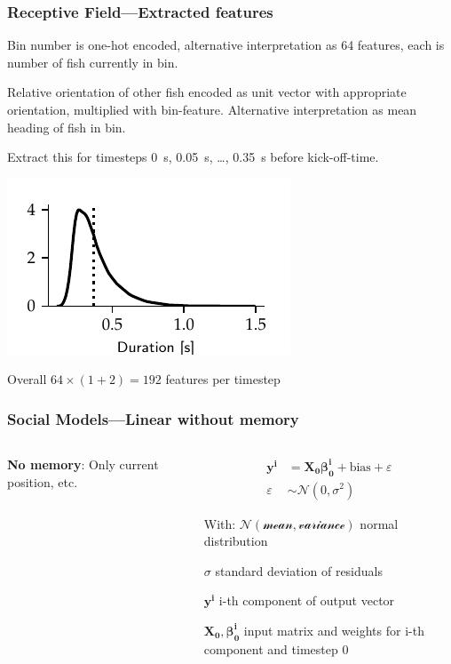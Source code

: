 \documentclass{beamer}
\begin{document}
\begin{frame}
  \frametitle{Receptive Field---Extracted features}
  Bin number is one-hot encoded, alternative interpretation as 64 features, each is number of fish currently in bin.

  Relative orientation of other fish encoded as unit vector with appropriate orientation, multiplied with bin-feature.
  Alternative interpretation as mean heading of fish in bin.

  Extract this for timesteps \SI{0}{\s}, \SI{0.05}{s}, \ldots, \SI{0.35}{\s} before kick-off-time.

  \includegraphics{kick_duration_beamer}

  Overall $64 \times (1 + 2) = 192$ features per timestep
\end{frame}

\begin{frame}
  \frametitle{Social Models---Linear without memory}
  \begin{columns}
   \begin{column}{0.5\textwidth}

 \textbf{No memory}: Only current position, etc.
\end{column}~\begin{column}{0.5\textwidth}
\begin{align*}
  \bm{y^i}  &= \bm{X_0} \bm{\beta^i_0} + \text{bias} + \varepsilon \\
  \varepsilon &\sim \mathcal{N}\left(0, \sigma^2 \right)
\end{align*}

With:
$\mathcal{N(\text{mean}, \text{variance})}$ normal distribution

$\sigma$ standard deviation of residuals

$\bm{y^i}$ i-th component of output vector

$\bm{X_0}, \bm{\beta^i_0}$ input matrix and weights for i-th component and timestep 0
\end{column}
 \end{columns}
  
\end{frame}
\end{document}
